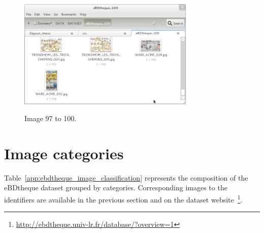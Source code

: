   \begin{figure}[h!]  %
    \centering
    
    \includegraphics[trim= 5px 10px 30px 152px, clip, width=0.75\textwidth]{thumb_10.png}
    \\
    \caption{Image 97 to 100.}
    \label{fig:app:9_10}
  \end{figure}



\section{Image categories}

Table~\ref{app:ebdtheque_image_classification} represents the composition of the eBDtheque dataset grouped by categories. 
Corresponding images to the identifiers are available in the previous section and on the dataset website~\footnote{\url{http://ebdtheque.univ-lr.fr/database/?overview=1}}.


